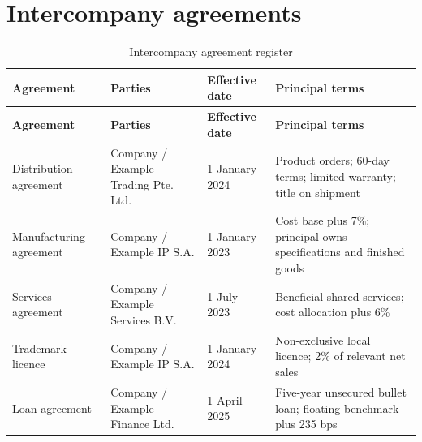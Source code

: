 \section{Intercompany agreements}
\begin{longtable}{@{}P{32mm}P{35mm}P{28mm}P{42mm}@{}}
  \caption{Intercompany agreement register}\label{tab:agreements}\\
  \toprule
  \textbf{Agreement} & \textbf{Parties} & \textbf{Effective date} & \textbf{Principal terms}\\
  \midrule
  \endfirsthead
  \toprule
  \textbf{Agreement} & \textbf{Parties} & \textbf{Effective date} & \textbf{Principal terms}\\
  \midrule
  \endhead
  Distribution agreement & Company / Example Trading Pte. Ltd. & 1 January 2024 & Product orders; 60-day terms; limited warranty; title on shipment\\
  Manufacturing agreement & Company / Example IP S.A. & 1 January 2023 & Cost base plus 7\%; principal owns specifications and finished goods\\
  Services agreement & Company / Example Services B.V. & 1 July 2023 & Beneficial shared services; cost allocation plus 6\%\\
  Trademark licence & Company / Example IP S.A. & 1 January 2024 & Non-exclusive local licence; 2\% of relevant net sales\\
  Loan agreement & Company / Example Finance Ltd. & 1 April 2025 & Five-year unsecured bullet loan; floating benchmark plus 235 bps\\
  \bottomrule
\end{longtable}
